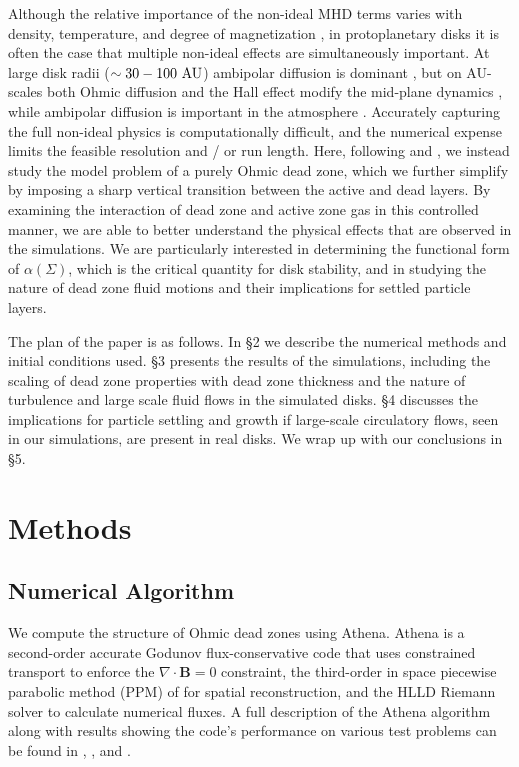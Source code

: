 Although the relative importance of the non-ideal MHD terms varies with density, temperature, and degree 
of magnetization \citep{balbus01,kunz04,xu15}, in protoplanetary disks it is often the case that multiple 
non-ideal effects are simultaneously important. At large disk radii ($\sim 30-100 \ {\rm AU}$) ambipolar 
diffusion is dominant \cite[e.g.,][]{desch04,kunz04,simon13a,simon13b}, but on AU-scales both Ohmic diffusion and the Hall 
effect modify the mid-plane dynamics \citep{desch04,kunz04,wardle07,lesur14,bai14,simon15}, while ambipolar diffusion is important in the atmosphere \citep{desch04,kunz04,wardle07,bai13}. Accurately capturing the full non-ideal physics is computationally difficult, and the numerical expense limits the feasible resolution and / or run length. Here, following \cite{fleming03} 
and \cite{okuzumi11}, we instead study the model problem of a purely Ohmic 
dead zone, which we further simplify by imposing a sharp vertical transition between the active and dead layers. 
By examining the interaction of dead zone and active zone gas in
this controlled manner, we are able to better understand the physical effects that are observed in the simulations. 
We are particularly interested in determining the functional form of $\alpha (\Sigma)$, which is the critical 
quantity for disk stability, and in studying the nature of dead zone fluid motions and their implications for 
settled particle layers.

The plan of the paper is as follows. In \S2 we describe the numerical methods and initial conditions used. \S3 presents the results of the simulations, including the scaling of dead zone properties with dead zone thickness and the nature of turbulence and large scale fluid flows in the simulated disks. \S4 discusses the implications for particle settling and growth if large-scale circulatory flows, seen in our simulations, are present in real disks. We wrap up with our conclusions in \S5.





\section{Methods}


\subsection{Numerical Algorithm}

We compute the structure of Ohmic dead zones using {\sc Athena}. {\sc Athena} is a second-order accurate Godunov flux-conservative code that uses constrained transport \cite[CT;][]{evans88} to enforce the $\nabla \cdot \mathbf{B} = 0$ constraint, the
third-order in space piecewise parabolic method (PPM) of \cite{colella84} for spatial reconstruction, and the HLLD Riemann solver \citep{miyoshi05,mignone07} to calculate numerical fluxes.  A full description of the {\sc Athena} algorithm
along with results showing the code's performance on various test problems can be found in \cite{gardiner05}, \cite{gardiner08}, and \cite{stone08}.

